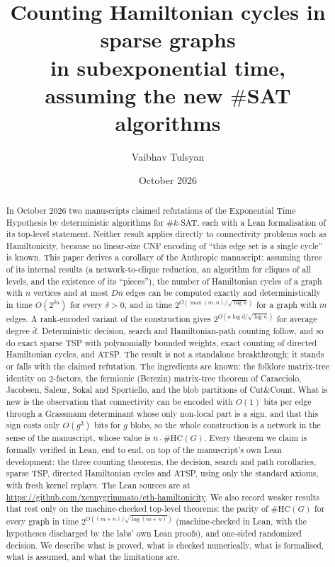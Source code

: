 \documentclass[11pt]{amsart}
\theoremstyle{plain}
\theoremstyle{definition}
\theoremstyle{remark}
\numberwithin{equation}{section}
\newcommand{\HC}{\#\mathrm{HC}}
\begin{document}
\title[Counting Hamiltonian cycles in sparse graphs]{Counting Hamiltonian cycles in sparse graphs\\ in subexponential time,\\ assuming the new $\#$SAT algorithms}

\author{Vaibhav Tulsyan}

\date{October 2026}


\begin{abstract}
In October 2026 two manuscripts claimed refutations of the Exponential Time Hypothesis by
deterministic algorithms for $\#k$-SAT, each with a Lean formalisation of its top-level
statement. Neither result applies directly to connectivity problems such as Hamiltonicity,
because no linear-size CNF encoding of ``this edge set is a single cycle'' is known. This
paper derives a corollary of the Anthropic manuscript: assuming three of its internal results (a
network-to-clique reduction, an algorithm for cliques of all levels, and the existence of its
``pieces''), the number of Hamiltonian cycles of a graph with $n$ vertices and at most $Dn$
edges can be computed exactly and deterministically in time $O(2^{\delta n})$ for every
$\delta>0$, and in time $2^{O(\max(m,n)/\sqrt{\log n})}$ for a graph with $m$ edges. A
rank-encoded variant of the construction gives $2^{O(n\log\bar d/\sqrt{\log n})}$ for average
degree $\bar d$. Deterministic decision, search and Hamiltonian-path counting follow, and so do
exact sparse TSP with polynomially bounded weights, exact counting of directed Hamiltonian cycles,
and ATSP. The result is not a
standalone breakthrough; it stands or falls with the claimed refutation. The ingredients are
known: the folklore matrix-tree identity on $2$-factors, the fermionic (Berezin) matrix-tree
theorem of Caracciolo, Jacobsen, Saleur, Sokal and Sportiello, and the blob partitions of
Cut\&Count. What is new is the observation that connectivity can be encoded with $O(1)$ bits
per edge through a Grassmann determinant whose only non-local part is a sign, and that this
sign costs only $O(g^3)$ bits for $g$ blobs, so the whole construction is a network in the sense
of the manuscript, whose value is $n\cdot\HC(G)$. Every theorem we claim is formally verified in Lean, end to end, on top of the manuscript's own
Lean development: the three counting theorems, the decision, search and path corollaries, sparse
TSP, directed Hamiltonian cycles and ATSP, using only the standard axioms, with fresh kernel replays.
The Lean sources are at \url{https://github.com/xennygrimmato/eth-hamiltonicity}. We also record weaker results
that rest only on the machine-checked top-level theorems: the parity of $\HC(G)$ for every
graph in time $2^{O((m+n)/\sqrt{\log(m+n)})}$ (machine-checked in Lean, with the hypotheses
discharged by the labs' own Lean proofs), and one-sided randomized decision. We describe what
is proved, what is checked numerically, what is formalised, what is assumed, and what the
limitations are.
\end{abstract}
\end{document}
